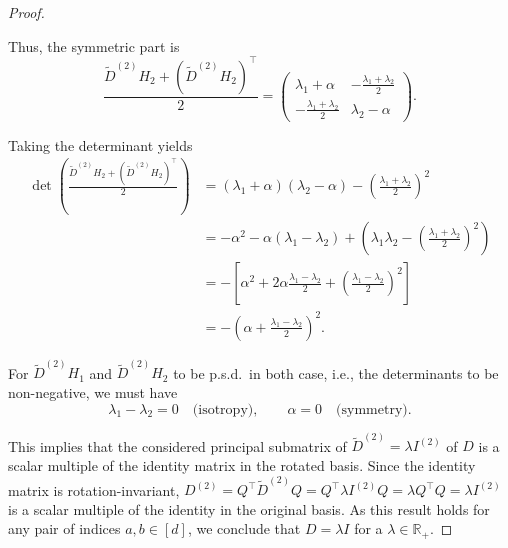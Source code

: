 \documentclass[twoside,11pt]{article}
\newcommand{\R}{\mathbb{R}}
\begin{document}
\begin{proof}
\begin{itemize}
      Thus, the symmetric part is
      \[
        \frac{\tilde{D}^{(2)}H_2 + (\tilde{D}^{(2)}H_2)^{\intercal}}{2}
        =
        \begin{pmatrix}
          \lambda_1 + \alpha & -\frac{\lambda_1 + \lambda_2}{2} \\
          -\frac{\lambda_1 + \lambda_2}{2} & \lambda_2 - \alpha
        \end{pmatrix}.
      \]

      Taking the determinant yields
      \begin{align*}
        \det\left(\frac{\tilde{D}^{(2)}H_2 + (\tilde{D}^{(2)}H_2)^{\intercal}}{2}\right)
        &= (\lambda_1 + \alpha)(\lambda_2 - \alpha) - \left(\frac{\lambda_1 + \lambda_2}{2}\right)^2 \\
        &= -\alpha^2 - \alpha(\lambda_1 - \lambda_2) + \left(\lambda_1\lambda_2 - \left(\frac{\lambda_1 + \lambda_2}{2}\right)^2\right)\\
        &= -\left[\alpha^2 + 2\alpha \frac{\lambda_1 - \lambda_2}{2} + \left(\frac{\lambda_1 - \lambda_2}{2}\right)^2\right]\\
        &= -\left(\alpha + \frac{\lambda_1 - \lambda_2}{2}\right)^2.
      \end{align*}
  \end{itemize}
  For $\tilde{D}^{(2)}H_1$ and $\tilde{D}^{(2)}H_2$ to be p.s.d.\ in both case, i.e., the determinants to be non-negative, we must have
  \[
    \lambda_1 - \lambda_2 = 0 \quad \text{(isotropy)}, \qquad
    \alpha = 0 \quad \text{(symmetry)}.
  \]

  This implies that the considered principal submatrix of $\tilde{D}^{(2)} = \lambda I^{(2)}$ of $D$ is a scalar multiple of the identity matrix in the rotated basis. 
  Since the identity matrix is rotation-invariant, $D^{(2)} = Q^\intercal \tilde{D}^{(2)} Q = Q^\intercal \lambda I^{(2)} Q = \lambda Q^\intercal Q = \lambda I^{(2)}$ is a scalar multiple of the identity in the original basis. 
  As this result holds for any pair of indices $a, b \in [d]$, we conclude that $D = \lambda I$ for a $\lambda \in \R_+$.
\end{proof}
\end{document}
